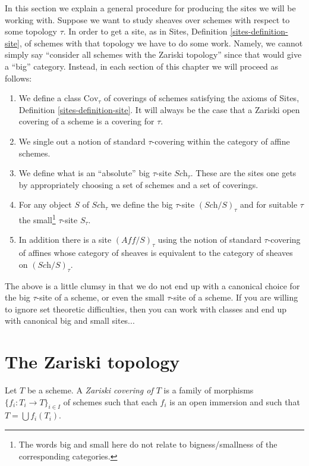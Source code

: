 \noindent
In this section we explain a general procedure for producing the
sites we will be working with. Suppose we want to study sheaves
over schemes with respect to some topology $\tau$. In order to
get a site, as in Sites, Definition \ref{sites-definition-site},
of schemes with that topology we have to do some work. Namely,
we cannot simply say ``consider all schemes with the Zariski topology''
since that would give a ``big'' category. Instead, in each section of
this chapter we will proceed as follows:
\begin{enumerate}
\item We define a class $\text{Cov}_\tau$ of coverings of schemes
satisfying the axioms of Sites, Definition \ref{sites-definition-site}.
It will always be the case that a Zariski open covering of
a scheme is a covering for $\tau$.
\item We single out a notion of standard
$\tau$-covering within the category of affine schemes.
\item We define what is an ``absolute'' big $\tau$-site $\textit{Sch}_\tau$.
These are the sites one gets by appropriately choosing a set of schemes
and a set of coverings.
\item For any object $S$ of $\textit{Sch}_\tau$
we define the big $\tau$-site $(\textit{Sch}/S)_\tau$ and for suitable
$\tau$ the small\footnote{The words big and
small here do not relate to bigness/smallness of the corresponding
categories.} $\tau$-site $S_\tau$.
\item In addition there is a site $(\textit{Aff}/S)_\tau$ using the
notion of standard $\tau$-covering of affines whose category of sheaves
is equivalent to the category of sheaves on $(\textit{Sch}/S)_\tau$.
\end{enumerate}
The above is a little clumsy in that we do not end up with a canonical
choice for the big $\tau$-site of a scheme, or even the small
$\tau$-site of a scheme. If you are willing to ignore set theoretic
difficulties, then you can work with classes and end up with
canonical big and small sites...







\section{The Zariski topology}
\label{section-zariski}

\begin{definition}
\label{definition-zariski-covering}
Let $T$ be a scheme. A {\it Zariski covering of $T$} is a family
of morphisms $\{f_i : T_i \to T\}_{i \in I}$ of schemes
such that each $f_i$ is an open immersion and such
that $T = \bigcup f_i(T_i)$.
\end{definition}

